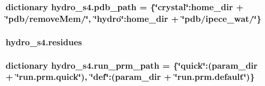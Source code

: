 \hypertarget{namespacehydro__s4_af11b629eba244d6dc31f27fea817fdbe}{
\subsubsection[{pdb\-\_\-path}]{\setlength{\rightskip}{0pt plus 5cm}dictionary hydro\-\_\-s4.\-pdb\-\_\-path = \{\char`\"{}crystal\char`\"{}\-:home\-\_\-dir + \char`\"{}pdb/remove\-Mem/\char`\"{}, \char`\"{}hydro\char`\"{}\-:home\-\_\-dir + \char`\"{}pdb/ipece\-\_\-wat/\char`\"{}\}}}\label{namespacehydro__s4_af11b629eba244d6dc31f27fea817fdbe}
\hypertarget{namespacehydro__s4_a15a9c8fb7e1468e0dbe978cb82ba6438}{
\subsubsection[{residues}]{\setlength{\rightskip}{0pt plus 5cm}hydro\-\_\-s4.\-residues}}\label{namespacehydro__s4_a15a9c8fb7e1468e0dbe978cb82ba6438}
\hypertarget{namespacehydro__s4_a26ca7150ba62a58db12918a1ce03a6cb}{
\subsubsection[{run\-\_\-prm\-\_\-path}]{\setlength{\rightskip}{0pt plus 5cm}dictionary hydro\-\_\-s4.\-run\-\_\-prm\-\_\-path = \{\char`\"{}quick\char`\"{}\-:(param\-\_\-dir + \char`\"{}run.\-prm.\-quick\char`\"{}), \char`\"{}def\char`\"{}\-:(param\-\_\-dir + \char`\"{}run.\-prm.\-default\char`\"{})\}}}\label{namespacehydro__s4_a26ca7150ba62a58db12918a1ce03a6cb}
